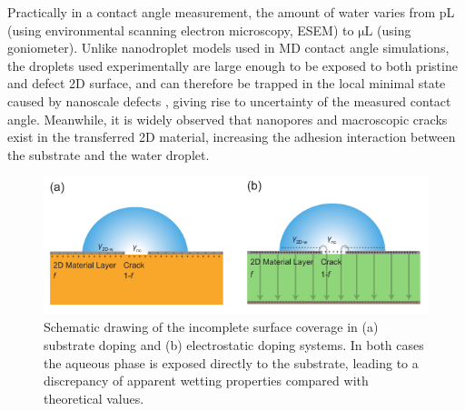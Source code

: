 \documentclass[aps,prl,reprint,groupedaddress,amsmath,amssymb, showpacs]{revtex4-1}
\begin{document}
Practically in a contact angle measurement, the amount of water varies
from pL (using environmental scanning electron microscopy, ESEM) to
\(\mathrm{\mu L}\) (using goniometer). Unlike nanodroplet models used in
MD contact angle simulations, the droplets used experimentally are
large enough to be exposed to both pristine and defect 2D surface, and
can therefore be trapped in the local minimal state caused by nanoscale
defects \cite{raj_wettability_2013}, giving rise to uncertainty of the
measured contact angle. Meanwhile, it is widely observed that
nanopores and macroscopic cracks exist in the transferred 2D material,
increasing the adhesion interaction between the substrate and the
water droplet.

\begin{figure}[htbp]
\centering
\includegraphics[width=0.95\linewidth]{../img/scheme-crack.pdf}
\caption{\label{fig:scheme-crack}
Schematic drawing of the incomplete surface coverage in (a) substrate doping and (b) electrostatic doping systems. In both cases the aqueous phase is exposed directly to the substrate, leading to a discrepancy of apparent wetting properties compared with theoretical values.}
\end{figure}
\end{document}
